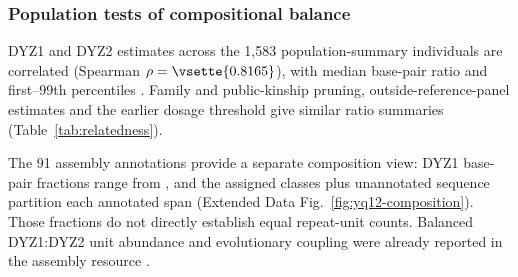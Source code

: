 \subsubsection{Population tests of compositional balance}\label{sec:res-balance}
DYZ1 and DYZ2 estimates across the 1,583 population-summary individuals are correlated (Spearman $\rho=\vsette{0.8165}$), with median base-pair ratio  and first--99th percentiles . Family and public-kinship pruning, outside-reference-panel estimates and the earlier dosage threshold give similar ratio summaries (Table~\ref{tab:relatedness}).

The 91 assembly annotations provide a separate composition view: DYZ1 base-pair fractions range from , and the assigned classes plus unannotated sequence partition each annotated span (Extended Data Fig.~\ref{fig:yq12-composition}). Those fractions do not directly establish equal repeat-unit counts. Balanced DYZ1:DYZ2 unit abundance and evolutionary coupling were already reported in the assembly resource \cite{Hallast2026}.

